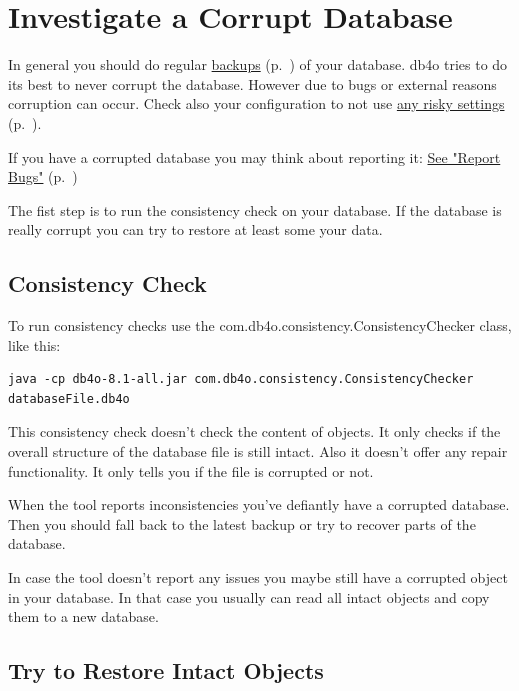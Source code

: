 \section{Investigate a Corrupt Database}
\label{ref:troubleshoot-corrupt-db}

In general you should do regular \hyperref[ref:advanced-topics-backup]{backups} (p.~\pageref{ref:advanced-topics-backup}) of your database. db4o tries to do its best to never corrupt the database. However due to bugs or external reasons corruption can occur. Check also your configuration to not use \hyperref[ref:basics-acid-and-transactions-dangerous-practises]{any risky settings} (p.~\pageref{ref:basics-acid-and-transactions-dangerous-practises}).

If you have a corrupted database you may think about reporting it: \hyperref[ref:community-report-bugs]{See "Report Bugs"} (p.~\pageref{ref:community-report-bugs})

The fist step is to run the consistency check on your database. If the database is really corrupt you can try to restore at least some your data.

\subsection*{Consistency Check}

To run consistency checks use the com.db4o.consistency.ConsistencyChecker class, like this:

\begin{lstlisting}
java -cp db4o-8.1-all.jar com.db4o.consistency.ConsistencyChecker databaseFile.db4o
\end{lstlisting}

This consistency check doesn't check the content of objects. It only checks if the overall structure of the database file is still intact. Also it doesn't offer any repair functionality. It only tells you if the file is corrupted or not.

When the tool reports inconsistencies you've defiantly have a corrupted database. Then you should fall back to the latest backup or try to recover parts of the database.

In case the tool doesn't report any issues you maybe still have a corrupted object in your database. In that case you usually can read all intact objects and copy them to a new database.

\subsection*{Try to Restore Intact Objects}

